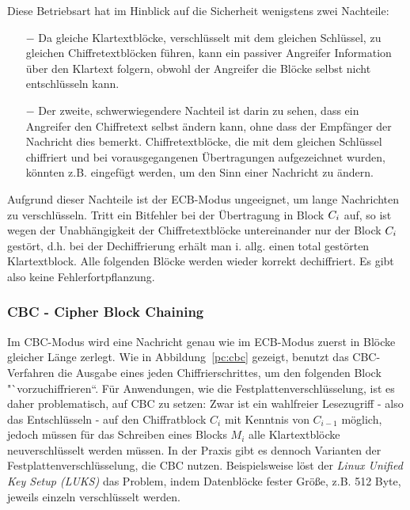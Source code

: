 Diese Betriebsart hat im Hinblick auf die Sicherheit wenigstens zwei Nachteile:

\begin{itemize}
  \item[$-$] Da gleiche Klartextblöcke, verschlüsselt mit dem gleichen Schlüssel, zu gleichen Chiffretextblöcken führen, kann ein passiver Angreifer
  Information über den Klartext folgern, obwohl der Angreifer die Blöcke selbst nicht entschlüsseln kann.
  \item[$-$] Der zweite, schwerwiegendere Nachteil ist darin zu sehen, dass ein Angreifer den Chiffretext selbst ändern kann, ohne dass der Empfänger der
  Nachricht dies bemerkt. Chiffretextblöcke, die mit dem gleichen Schlüssel chiffriert und bei vorausgegangenen Übertragungen aufgezeichnet wurden, könnten
  z.B. eingefügt werden, um den Sinn einer Nachricht zu ändern.
\end{itemize}

Aufgrund dieser Nachteile ist der ECB-Modus ungeeignet, um lange Nachrichten zu verschlüsseln. Tritt ein Bitfehler bei der Übertragung in Block $C_i$ auf, so ist wegen der Unabhängigkeit der Chiffretextblöcke untereinander nur der Block
$C_i$ gestört, d.h. bei der Dechiffrierung erhält man i. allg. einen total gestörten Klartextblock. Alle folgenden Blöcke werden wieder korrekt
dechiffriert. Es gibt also keine Fehlerfortpflanzung.

\subsubsection{CBC - Cipher Block Chaining}
\label{cbc}

Im CBC-Modus wird eine Nachricht genau wie im ECB-Modus zuerst in Blöcke gleicher Länge zerlegt. Wie in Abbildung~\ref{pc:cbc} gezeigt, benutzt das CBC-Verfahren die Ausgabe eines jeden Chiffrierschrittes, um den folgenden Block "`vorzuchiffrieren``.
Für Anwendungen, wie die Festplattenverschlüsselung, ist es daher problematisch, auf CBC zu setzen: Zwar ist ein wahlfreier Lesezugriff - also das Entschlüsseln - auf den Chiffratblock $C_i$ mit Kenntnis von $C_{i-1}$ möglich, jedoch müssen für das Schreiben eines Blocks $M_i$ alle Klartextblöcke neuverschlüsselt werden müssen. In der Praxis gibt es dennoch Varianten der Festplattenverschlüsselung, die CBC nutzen.
Beispielsweise löst der \textit{Linux Unified Key Setup (LUKS)} das Problem, indem Datenblöcke fester Größe, z.B. 512 Byte, jeweils einzeln verschlüsselt werden.

